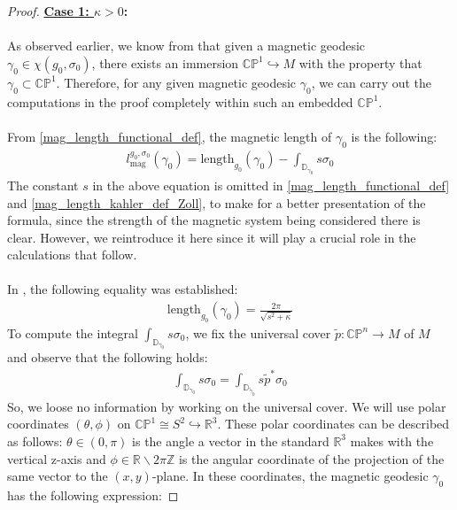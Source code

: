 \documentclass[11pt]{amsart}
\theoremstyle{plain}
\theoremstyle{definition}
\theoremstyle{remark}
\begin{document}
\begin{proof}
\textbf{\underline{Case 1: $\kappa >0$}:}\\
\\
As observed earlier, we know from \cite[Pg. 27]{johanna_projective} that given a magnetic geodesic $\gamma_{0} \in \chi(g_{0}, \sigma_{0})$, there exists an immersion $\mathbb{CP}^1 \hookrightarrow M$ with the property that $\gamma_{0} \subset \mathbb{CP}^1$. Therefore, for any given magnetic geodesic $\gamma_{0}$, we can carry out the computations in the proof completely within such an embedded $\mathbb{CP}^1$.\\
\\
From \eqref{mag_length_functional_def}, the magnetic length of $\gamma_0$ is the following:
\begin{align}
    l^{g_0,\sigma_0}_{\text{mag}}(\gamma_{0}) = \text{length}_{g_0}(\gamma_{0}) - \int_{\mathbb{D}_{\gamma_{0}} } s\sigma_{0} 
\end{align}
The constant $s$ in the above equation is omitted in \eqref{mag_length_functional_def} and \eqref{mag_length_kahler_def_Zoll}, to make for a better presentation of the formula, since the strength of the magnetic system being considered there is clear. However, we reintroduce it here since it will play a crucial role in the calculations that follow.\\
\\
In \cite[Pg. 27]{johanna_projective}, the following equality was established:
\begin{align}\label{paradigm_1_lenght_FS}
\text{length}_{g_0}(\gamma_{0}) = \frac{2\pi}{\sqrt{s^2+ \kappa}}
\end{align}
To compute the integral $\int_{\mathbb{D}_{\gamma_0}} s\sigma_{\text{0}}$, we fix the universal cover $\tilde p: \mathbb{CP}^n \rightarrow M$ of $M$ and observe that the following holds:
\begin{align}
    \int_{\mathbb{D}_{\gamma_0}} s\sigma_{\text{0}} =\int_{\mathbb{D}_{\tilde \gamma_0}} s\tilde p^*\sigma_{\text{0}}
\end{align}
So, we loose no information by working on the universal cover. We will use polar coordinates $(\theta, \phi)$ on $\mathbb{CP}^1 \cong S^2 \hookrightarrow \mathbb{R}^3$. These polar coordinates can be described as follows: $ \theta \in (0, \pi)$ is the angle a vector in the standard $\mathbb{R}^3$ makes with the vertical $\text{z}$-axis and $\phi \in \mathbb{R} \backslash 2\pi \mathbb{Z}$ is the angular coordinate of the projection of the same vector to the $(x,y)$-plane. In these coordinates, the magnetic geodesic $\gamma_0$ has the following expression:

\end{proof}
\end{document}
